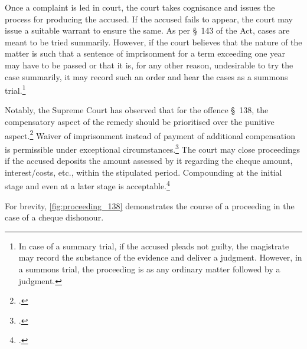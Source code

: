 Once a complaint is led in court, the court takes cognisance and issues the process for producing the accused. If the accused fails to appear, the court may issue a suitable warrant to ensure the same. As per \S~143 of the Act, cases are meant to be tried summarily. However, if the court believes that the nature of the matter is such that a sentence of imprisonment for a term exceeding one year may have to be passed or that it is, for any other reason, undesirable to try the case summarily, it may record such an order and hear the cases as a summons trial.\footnote{In case of a summary trial, if the accused pleads not guilty, the magistrate may record the substance of the evidence and deliver a judgment. However, in a summons trial, the proceeding is as any ordinary matter followed by a judgment.}

Notably, the Supreme Court has observed that for the offence \S~138, the compensatory aspect of the remedy should be prioritised over the punitive aspect.\footcite{sc2010_damodar} Waiver of imprisonment instead of payment of additional compensation is permissible under exceptional circumstances.\footcite{sc2018_priyanka} The court may close proceedings if the accused deposits the amount assessed by it regarding the cheque amount, interest/costs, etc., within the stipulated period. Compounding at the initial stage and even at a later stage is acceptable.\footcite{sc2018_meters}

For brevity, \cref{fig:proceeding_138} demonstrates the course of a proceeding in the case of a cheque dishonour.


